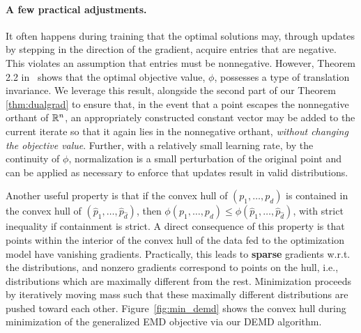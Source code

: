 \paragraph{A few practical adjustments.}
It often happens during training that the optimal solutions may, through updates by stepping in the direction of the gradient, acquire entries that are negative. 
This violates an assumption that entries must be nonnegative. However, Theorem 2.2 in~\cite{kline2019properties} shows that the optimal objective value, $\phi$, possesses a type of translation invariance.  We leverage this result, alongside the second part of our Theorem \ref{thm:dualgrad} to ensure that, in the event that a point escapes the nonnegative orthant of $\mathbb{R}^{n}$,
an appropriately constructed constant vector may be added to the current iterate so that it again lies in the nonnegative orthant, \textit{without changing the objective value}. 
Further, with a
relatively small learning rate, by the continuity of $\phi$, normalization is a small perturbation of the original point and can be applied as necessary to enforce that updates result in valid distributions. 

\begin{remark}
Another useful property is that if the convex hull of $(p_1,\ldots,p_d)$ is contained in the convex hull of $(\hat{p}_1,\ldots,\hat{p}_{\hat{d}})$, then $\phi(p_1,\ldots,p_d)\leq \phi(\hat{p}_1,\ldots,\hat{p}_{\hat{d}})$, with strict inequality if containment is strict.
A direct consequence of this property is that points within the interior of the convex hull of the data fed to the optimization model have vanishing gradients.
Practically, this leads to \textbf{sparse} gradients w.r.t. the distributions, and nonzero gradients correspond to points on the hull, i.e., distributions which are maximally different from the rest.
Minimization proceeds by iteratively moving mass such that these maximally different distributions are pushed toward each other.
Figure~\ref{fig:min_demd} shows the convex hull during minimization of the generalized EMD objective via our DEMD algorithm.
\end{remark}

